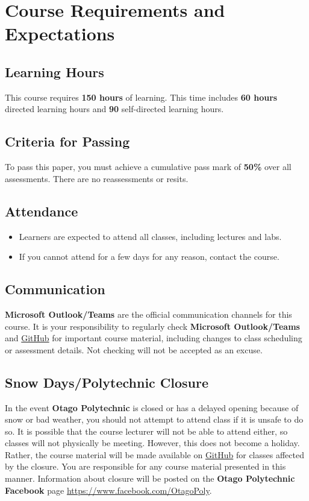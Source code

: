 \documentclass{article}
\begin{document}
\section*{Course Requirements and Expectations}

\subsection*{Learning Hours}
This course requires \textbf{150 hours} of learning. This time includes \textbf{60 hours} directed learning hours and \textbf{90} self-directed learning hours.

\subsection*{Criteria for Passing}
To pass this paper, you must achieve a cumulative pass mark of \textbf{50\%} over all assessments. There are no reassessments or resits.

\subsection*{Attendance}
\begin{itemize}
	\item Learners are expected to attend all classes, including lectures and labs.
	\item If you cannot attend for a few days for any reason, contact the course.
\end{itemize}

\subsection*{Communication}
\textbf{Microsoft Outlook/Teams} are the official communication channels for this course. It is your responsibility to regularly check \textbf{Microsoft Outlook/Teams} and \href{https://github.com/otago-polytechnic-bit-courses/ID623001-introduction-to-algorithmic-problem-solving}{GitHub} for important course material, including changes to class scheduling or assessment details. Not checking will not be accepted as an excuse.

\subsection*{Snow Days/Polytechnic Closure}
In the event \textbf{Otago Polytechnic} is closed or has a delayed opening because of snow or bad weather, you should not attempt to attend class if it is unsafe to do so. It is possible that the course lecturer will not be able to attend either, so classes will not physically be meeting. However, this does not become a holiday. Rather, the course material will be made available on \href{https://github.com/otago-polytechnic-bit-courses/ID623001-introduction-to-algorithmic-problem-solving}{GitHub} for classes affected by the closure. You are responsible for any course material presented in this manner. Information about closure will be posted on the \textbf{Otago Polytechnic Facebook} page \href{https://www.facebook.com/OtagoPoly}{https://www.facebook.com/OtagoPoly}.
\end{document}
